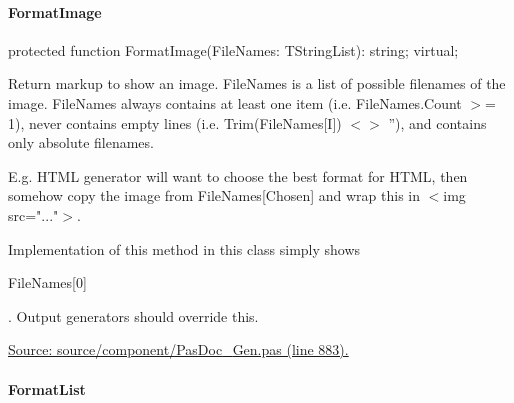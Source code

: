 \documentclass{report}
\newif\ifpdf
\begin{document}
\paragraph*{FormatImage}\hspace*{\fill}

\label{PasDoc_Gen.TDocGenerator-FormatImage}
\begin{list}{}{
\setlength{\itemindent}{0cm}
\setlength{\listparindent}{0cm}
\setlength{\leftmargin}{\evensidemargin}
\addtolength{\leftmargin}{\tmplength}
\settowidth{\labelsep}{X}
\addtolength{\leftmargin}{\labelsep}
\setlength{\labelwidth}{\tmplength}
}
\item[\textbf{Declaration}\hfill]
\ifpdf
\begin{flushleft}
\fi
\begin{ttfamily}
protected function FormatImage(FileNames: TStringList): string; virtual;\end{ttfamily}

\ifpdf
\end{flushleft}
\fi

\par
\item[\textbf{Description}]
Return markup to show an image. FileNames is a list of possible filenames of the image. FileNames always contains at least one item (i.e. FileNames.Count {$>$}= 1), never contains empty lines (i.e. Trim(FileNames[I]) {$<$}{$>$} ''), and contains only absolute filenames.

E.g. HTML generator will want to choose the best format for HTML, then somehow copy the image from FileNames[Chosen] and wrap this in {$<$}img src="..."{$>$}.

Implementation of this method in this class simply shows \begin{ttfamily}FileNames[0]\end{ttfamily}. Output generators should override this.\par
\href{https://github.com/pasdoc/pasdoc/blob/master/source/component/PasDoc_Gen.pas#L883}{Source: source/component/PasDoc{\_}Gen.pas (line 883).}

\end{list}
\paragraph*{FormatList}\hspace*{\fill}
\end{document}
